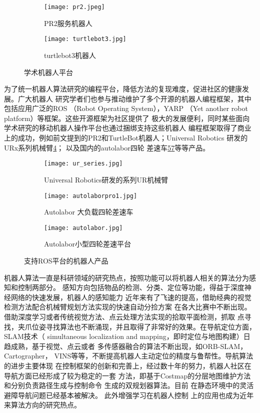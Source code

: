 \begin{figure}
\centering
\begin{subfigure}{.6\textwidth}
  \centering
  \texttt{[image: pr2.jpeg]}
  \caption{PR2服务机器人}
  \label{fig:pr2}
\end{subfigure}%
\begin{subfigure}{.4\textwidth}
  \centering
  \texttt{[image: turtlebot3.jpg]}
  \caption{turtlebot3机器人}
  \label{fig:turtlebot}
\end{subfigure}
\caption{学术机器人平台}
\end{figure}

为了统一机器人算法研究的编程平台，降低方法的复现难度，促进社区的健康发展。广大机器人
研究学者们也参与推动维护了多个开源的机器人编程框架，其中包括应用广泛的ROS
（Robot Operating System）\cite{quigley2009ros}，YARP
（Yet another robot platform）\cite{metta2006yarp}等框架。这些开源框架为社区提供了
极大的发展便利，同时某些面向学术研究的移动机器人操作平台也通过捆绑支持这些机器人
编程框架取得了商业上的成功，例如前文提到的PR2和TurtleBot机器人；Universal Robotics
研发的URx系列机械臂\ref{fig:urx}； 以及国内的autolabor四轮
差速车\ref{fig:autolaborpro1}\ref{fig:autolabor}等等产品。


\begin{figure}
\centering
\begin{subfigure}{.6\textwidth}
  \centering
  \texttt{[image: ur\_series.jpg]}
  \caption{Universal Robotics研发的系列UR机械臂}
  \label{fig:urx}
\end{subfigure}%
\begin{subfigure}{.4\textwidth}
  \centering
  \texttt{[image: autolaborpro1.jpg]}
  \caption{Autolabor 大负载四轮差速车}
  \label{fig:autolaborpro1}
\end{subfigure}
\begin{subfigure}{.5\textwidth}
  \centering
  \texttt{[image: autolabor.jpg]}
  \caption{Autolabor小型四轮差速平台}
  \label{fig:autolabor}
\end{subfigure}
\caption{支持ROS平台的机器人产品}
\end{figure}


机器人算法一直是科研领域的研究热点，按照功能可以将机器人相关的算法分为感知和控制两部分。
感知方向包括物品的检测、分类、定位等功能，得益于深度神经网络的快速发展，机器人的感知能力
近年来有了飞速的提高，借助经典的视觉检测方法配合机械臂规划方法实现的快速自动分捡方案
在各大比赛中不断出现。借助深度学习或者传统视觉方法、点云处理方法实现的拾取平面检测，抓取
点寻找，夹爪位姿寻找算法也不断涌现，并且取得了非常好的效果。在导航定位方面，SLAM技术（
simultaneous localization and mapping，即时定位与地图构建）日趋成熟，基于视觉、点云或者
多传感器融合的算法不断出现，如ORB-SLAM\cite{mur2015orb}，Cartographer\cite{hess2016real}，
VINS\cite{qin2018vins}等等，不断提高机器人主动定位的精度与鲁帮性。导航算法的进步主要体现
在控制框架的创新和完善上，经过数十年的努力，机器人社区在导航方面已经形成了较为稳定的一套
方法，即基于Costmap的分层地图维护方法\cite{lu2014layered}和分别负责路径生成与控制命令
生成的双规划器算法\cite{guimaraes2016ros}。目前
在静态环境中的灵活避障导航问题已经基本被解决\cite{Zhou2017A}。 此外增强学习在机器人控制
上的应用也成为近年来算法方向的研究热点\cite{schaal2002learning}。

